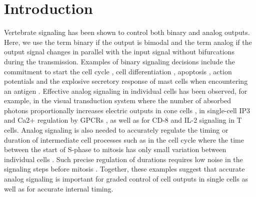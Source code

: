 \section{Introduction}
Vertebrate signaling has been shown to control both binary and analog outputs. Here, we use the term binary if the output is bimodal and the term analog if the output signal changes in parallel with the input signal without bifurcations during the transmission. Examples of binary signaling decisions include the commitment to start the cell cycle \cite{Cappell2016}, cell differentiation \cite{Chang2008,Jukam2010,Ahrends2014}, apoptosis \cite{Spencer2009}, action potentials \cite{Hodgkin1952} and the explosive secretory response of mast cells when encountering an antigen \cite{Hide1993}. Effective analog signaling in individual cells has been observed, for example, in the visual transduction system where the number of absorbed photons proportionally increases electric outputs in cone cells \cite{Arshavsky2002}, in single-cell IP3 and Ca2+ regulation by GPCRs \cite{Nash2001}, as well as for CD-8 \cite{Tkach2014} and IL-2 signaling \cite{Feinerman2008} in T cells. Analog signaling is also needed to accurately regulate the timing or duration of intermediate cell processes such as in the cell cycle where the time between the start of S-phase to mitosis has only small variation between individual cells \cite{Spencer2013}. Such precise regulation of durations requires low noise in the signaling steps before mitosis \cite{Kar2009}. Together, these examples suggest that accurate analog signaling is important for graded control of cell outputs in single cells as well as for accurate internal timing. 

